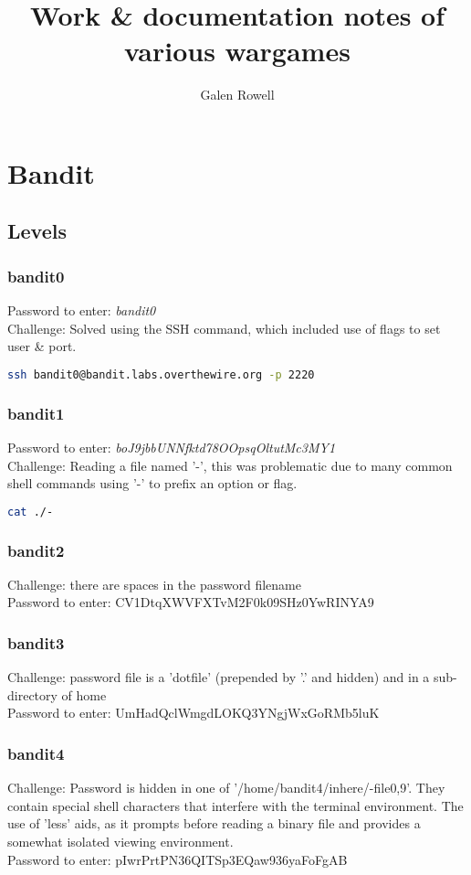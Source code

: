 \documentclass[a4paper]{article}
\newcommand{\pass}[1]{Password to enter: \textit{#1}\\}
\begin{document}
\title{Work \& documentation notes of various wargames}
\author{Galen Rowell}
\maketitle


\section{Bandit}
\subsection{Levels}

\subsubsection{bandit0}
\pass{bandit0}
Challenge: Solved using the SSH command, which included use of flags to set user \& port.\\
\begin{lstlisting}[language=Bash]
ssh bandit0@bandit.labs.overthewire.org -p 2220
\end{lstlisting}

\subsubsection{bandit1}
\pass{boJ9jbbUNNfktd78OOpsqOltutMc3MY1}
Challenge: Reading a file named '-', this was problematic due to many common shell commands using '-' to prefix an option or flag.\\
\begin{lstlisting}[language=Bash]
cat ./-
\end{lstlisting}

\subsubsection{bandit2}
Challenge: there are spaces in the password filename\\
Password to enter: CV1DtqXWVFXTvM2F0k09SHz0YwRINYA9
\subsubsection{bandit3}
Challenge: password file is a 'dotfile' (prepended by '.' and hidden) and in a sub-directory of home\\
Password to enter: UmHadQclWmgdLOKQ3YNgjWxGoRMb5luK
\subsubsection{bandit4}
Challenge: Password is hidden in one of '/home/bandit4/inhere/-file{0,9}'. They contain special shell characters that interfere with the terminal environment. The use of 'less' aids, as it prompts before reading a binary file and provides a somewhat isolated viewing environment.\\
Password to enter: pIwrPrtPN36QITSp3EQaw936yaFoFgAB
\end{document}
